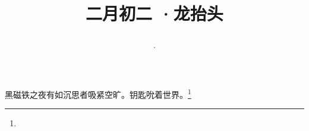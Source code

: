 \title{\date[d=11,m=3,y=2024][year:cn-y,年,month:cn,day:cn,日,·,weekday]·二月初二 ·龙抬头}
黑磁铁之夜有如沉思者吸紧空旷。钥匙吮着世界。\footnote{ }

